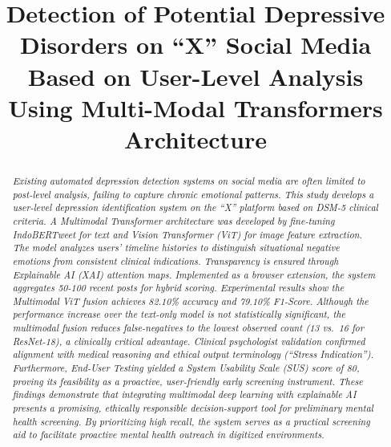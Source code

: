 \documentclass[conference]{IEEEtran}
\begin{document}
\title{Detection of Potential Depressive Disorders on ``X'' Social Media Based on User-Level Analysis Using Multi-Modal Transformers Architecture}

\author{
\and
{}
\and
{}
}

\maketitle

\begin{abstract}
\textit{Existing automated depression detection systems on social media are
often limited to post-level analysis, failing to capture chronic
emotional patterns. This study develops a user-level depression
identification system on the ``X'' platform based on DSM-5 clinical
criteria. A Multimodal Transformer architecture was developed by
fine-tuning IndoBERTweet for text and Vision Transformer (ViT) for
image feature extraction. The model analyzes users' timeline histories
to distinguish situational negative emotions from consistent clinical
indications. Transparency is ensured through Explainable AI (XAI)
attention maps. Implemented as a browser extension, the system
aggregates 50-100 recent posts for hybrid scoring. Experimental
results show the Multimodal ViT fusion achieves 82.10\% accuracy and
79.10\% F1-Score. Although the performance increase over the text-only
model is not statistically significant, the multimodal fusion reduces
false-negatives to the lowest observed count (13 vs.\ 16 for ResNet-18), a
clinically critical advantage. Clinical psychologist validation
confirmed alignment with medical reasoning and ethical output
terminology (``Stress Indication''). Furthermore, End-User Testing
yielded a System Usability Scale (SUS) score of 80, proving its
feasibility as a proactive, user-friendly early screening instrument.
These findings demonstrate that integrating multimodal deep learning with
explainable AI presents a promising, ethically responsible decision-support
tool for preliminary mental health screening. By prioritizing high recall, 
the system serves as a practical screening aid to facilitate 
proactive mental health outreach in digitized environments.}
\end{abstract}
\end{document}
